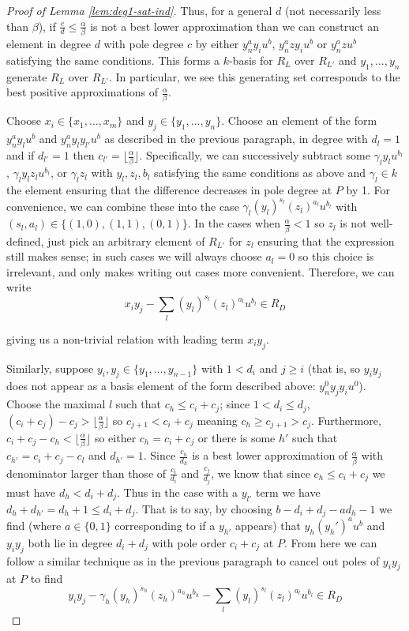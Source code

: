 \documentclass{amsart}
\theoremstyle{plain}
\theoremstyle{definition}
\theoremstyle{remark}
\numberwithin{equation}{section}
\newcommand \halfcan{L}
\begin{document}
\begin{proof}[Proof of Lemma \ref{lem:deg1-sat-ind}]
Thus, for a general $d$ (not necessarily less than $\beta$), if $\frac{c}{d} \le
\frac{\alpha}{\beta}$ is not a best lower approximation than we can
construct an element in degree $d$ with pole degree $c$ by either $y
_n^a y_i u^b$, $y_n^a zy_iu^b$ or $y_n^a z u^b$ satisfying the
same conditions.  This forms a $k$-basis for $R_{\halfcan}$ over $R_{\halfcan'}$ and $y_1, \ldots, y_n$ generate $R_{\halfcan}$ over $R_{\halfcan'}$.  In particular, we see this generating set corresponds to the best positive approximations of $\frac{\alpha}{\beta}$.

Choose $x_i\in \{x_1, \ldots, x_m\}$ and $y_j\in \{y_1, \ldots, y_n\}$.  Choose an element of the form $y_n^a y_l u^b$ and $y_n^a y_l y_{l'} u^b$ as described in the previous paragraph, in degree with $d_l= 1$ and if 
$d_{l'}= 1$ then $c_{l'} = \lfloor \frac{\alpha}{\beta} \rfloor$. Specifically, we can 
successively subtract some $\gamma_l y_l u^{b_l}$, $\gamma_l y_l z_l u^{b_l}$, or $
\gamma_l z_l$ with $y_l, z_l, b_l$ satisfying the same conditions as above and $\gamma_l
\in k$ the element ensuring that the difference decreases in pole degree at $P$ by 1. For 
convenience, we can combine these into the case $\gamma_l (y_l)^{s_l}(z_l)^{a_l}u^{b_l}$ 
with $(s_l,a_l)\in \{(1,0),(1,1),(0,1)\}$. In the cases when $\frac{\alpha}{\beta}<1$ so $z_l$ 
is not well-defined, just pick an arbitrary element of $R_{\halfcan'}$ for $z_l$ ensuring that the 
expression still makes sense; in such cases we will always choose $a_l= 0$ so this choice 
is irrelevant, and only makes writing out cases more convenient. Therefore, we can write
\[
	x_i y_j - \sum_{l} (y_l)^{s_l} (z_l)^{a_l} u^{b_l}\in R_D
\]

\noindent
giving us a non-trivial relation with leading term $x_i y_j$. 

Similarly, suppose $y_i, y_j\in \{y_1, \ldots , y_{n - 1}\}$ with $1
< d_i$ and $j \ge i$ (that is, so $y_i y_j$ does not appear as a
basis element of the form described above: $y_n^0 y_j y_i u^0$). 
Choose the maximal $l$ such that $c_h \le c_i + c_j$; since $1 < d_i
\le d_j$, $(c_i + c_j) - c_j>\lfloor \frac{\alpha}{\beta}\rfloor$
so $c_{j + 1} < c_i + c_j$ meaning $c_h \ge c_{j + 1} > c_j$.
Furthermore, $c_i + c_j - c_h < \lfloor \frac{\alpha}{\beta} \rfloor
$ so either $c_h = c_i + c_j$ or there is some $h'$ such that $c_{h'}
= c_i + c_j - c_l$ and $d_{h'}= 1$. Since $\frac{c_h}{d_h}$ is a
best lower approximation of $\frac{\alpha}{\beta}$ with denominator
larger than those of $\frac{c_i}{d_i}$ and $\frac{c_j}{d_j}$, we
know that since $c_h\le c_i + c_j$ we must have $d_h < d_i + d_j$. 
Thus in the case with a $y_{l'}$ term we have $d_h + d_{h'} = d_h +
1 \le d_i + d_j$. That is to say, by choosing $b - d_i + d_j - a d_
h - 1$ we find (where $a \in \{0,1\}$ corresponding to if a $y_{h'}$
appears) that $y_h (y_h')^a u^b$ and $y_i y_j$ both lie in degree
$d_i + d_j$ with pole order $c_i + c_j$ at $P$. From here we can
follow a similar technique as in the previous paragraph to cancel
out poles of $y_i y_j$ at $P $ to find
\[
	y_i y_j -\gamma_h (y_h)^{s_h}(z_{h})^{a_h}u^{b_h} -\sum_l (y_l)^{s_l} (z_{l})^{a_l}
	u^{b_l}\in R_D
\]


\end{proof}
\end{document}

